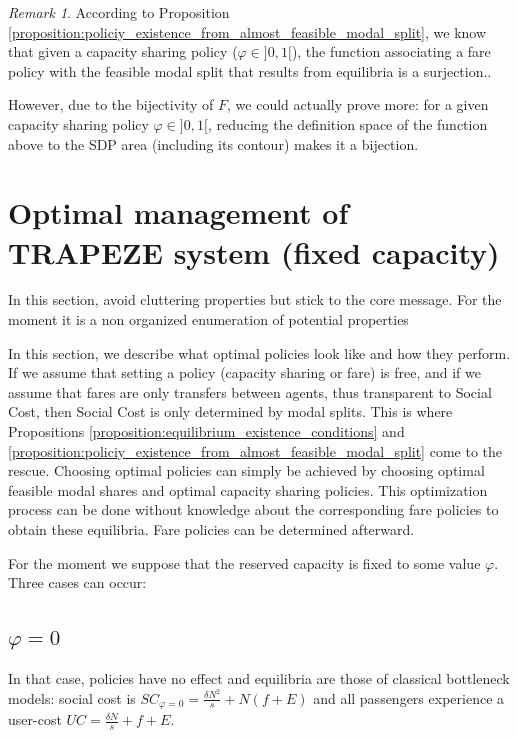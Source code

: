 \documentclass[english, a4paper]{article}
\theoremstyle{plain}
\theoremstyle{definition}
\theoremstyle{remark}
\newtheorem{remark}{Remark}
\begin{document}
\begin{remark}
    According to Proposition \ref{proposition:policiy_existence_from_almost_feasible_modal_split}, we know that given a capacity sharing policy ($\varphi \in ]0, 1[$), the function associating a fare policy with the feasible modal split that results from equilibria is a surjection..
    
    However, due to the bijectivity of $F$, we could actually prove more: for a given capacity sharing policy $\varphi \in ]0, 1[$, reducing the definition space of the function above to the SDP area (including its contour) makes it a bijection.
\end{remark}



\section{Optimal management of TRAPEZE system (fixed capacity)}
\alert{In this section, avoid cluttering properties but stick to the core message. For the moment it is a non organized enumeration of potential properties}

In this section, we describe what optimal policies look like and how they perform. If we assume that setting a policy (capacity sharing or fare) is free, and if we assume that fares are only transfers between agents, thus transparent to Social Cost, then Social Cost is only determined by modal splits. This is where Propositions \ref{proposition:equilibrium_existence_conditions} and \ref{proposition:policiy_existence_from_almost_feasible_modal_split} come to the rescue. Choosing optimal policies can simply be achieved by choosing optimal feasible modal shares and optimal capacity sharing policies. This optimization process can be done without knowledge about the corresponding fare policies to obtain these equilibria. Fare policies can be determined afterward.

For the moment we suppose that the reserved capacity is fixed to some value $\varphi$. Three cases can occur:

\subsection{\texorpdfstring{$\varphi = 0$}{varphi = 0}}

In that case, policies have no effect and equilibria are those of classical bottleneck models: social cost is $SC_{\varphi = 0} = \frac{\delta N^2}{s} + N(f + E)$ and all passengers experience a user-cost $UC = \frac{\delta N}{s} + f + E$.
\end{document}
